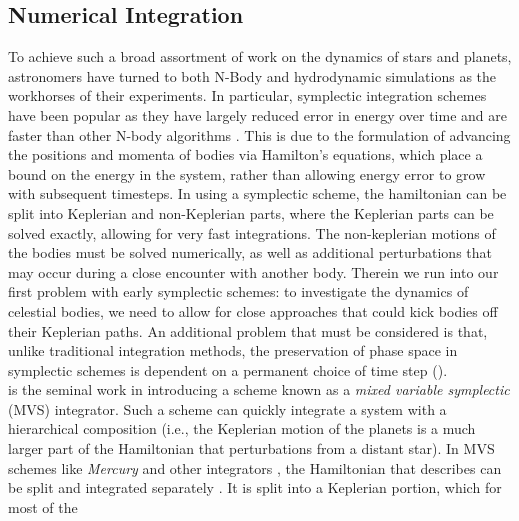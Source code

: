 \documentclass{aastex631}
\begin{document}
\subsection{Numerical Integration}
To achieve such a broad assortment of work on the dynamics of stars and planets, astronomers have turned to both N-Body and hydrodynamic simulations as the workhorses
of their experiments.
In particular, symplectic integration schemes have been popular as they have largely reduced error in energy over time and are 
faster than other N-body algorithms \citep{cha99,sah92}.
This is due to the formulation of advancing the positions and momenta of bodies via Hamilton's equations, which place a bound on the energy
in the system, rather than allowing energy error to grow with subsequent timesteps. In using a
symplectic scheme, the hamiltonian can be split into Keplerian and non-Keplerian parts, where the Keplerian parts can be solved exactly,
allowing for very fast integrations. The non-keplerian motions of the bodies must be solved numerically, as well as additional perturbations that may occur 
during a close encounter with another body.
Therein we run into our first problem with early symplectic schemes: to investigate the dynamics of celestial bodies, we need to allow for close approaches
that could kick bodies off their Keplerian paths. An additional problem that must be considered is that, unlike traditional integration methods,
the preservation of phase space in symplectic schemes is dependent on a permanent choice of time step (\cite{lee97conf}).\\
\indent \cite{wis91} is the seminal work in introducing a  scheme known as a \textit{mixed variable symplectic} (MVS) integrator. Such a scheme can quickly integrate
a system with a hierarchical composition (i.e., the Keplerian motion of the planets is a much larger part of the Hamiltonian that perturbations from a distant star).
In MVS schemes like \textit{Mercury} and other integrators \citep{dun98,ric00}, the Hamiltonian that describes
can be split and integrated separately \citep{yos90,sah92}. It is split into a Keplerian portion, which for most of the 
\end{document}
